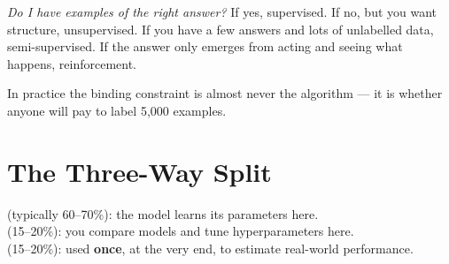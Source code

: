 \begin{conceptbox}
\emph{Do I have examples of the right answer?} If yes, supervised. If no, but you
want structure, unsupervised. If you have a few answers and lots of unlabelled
data, semi-supervised. If the answer only emerges from acting and seeing what
happens, reinforcement.

In practice the binding constraint is almost never the algorithm --- it is whether
anyone will pay to label 5{,}000 examples.
\end{conceptbox}

\section{The Three-Way Split}

\begin{definitionbox}
 (typically 60--70\%): the model learns its parameters here.\\
 (15--20\%): you compare models and tune hyperparameters here.\\
 (15--20\%): used \textbf{once}, at the very end, to estimate real-world
performance.
\end{definitionbox}

